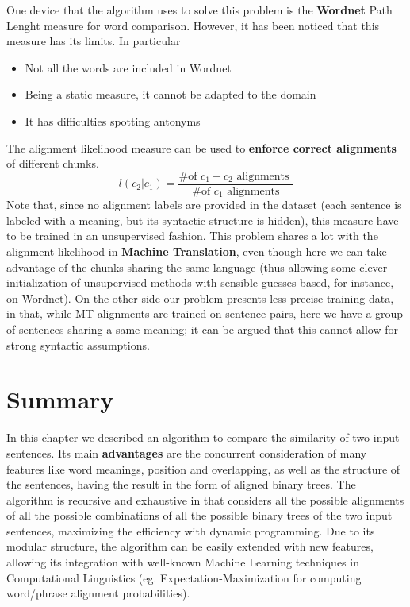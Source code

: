 One device that the algorithm uses to solve this problem is the \textbf{Wordnet} Path Lenght measure for word comparison. However, it has been noticed that this measure has its limits. In particular
\begin{itemize}
\item Not all the words are included in Wordnet
\item Being a static measure, it cannot be adapted to the domain
\item It has difficulties spotting antonyms
\end{itemize}
The alignment likelihood measure can be used to \textbf{enforce correct alignments} of different chunks.
$$
l(c_2|c_1)=\frac{\text{\# of }c_1-c_2\text{ alignments }}{\text{\# of }c_1\text{ alignments}}
$$
Note that, since no alignment labels are provided in the dataset (each sentence is labeled with a meaning, but its syntactic structure is hidden), this measure have to be trained in an unsupervised fashion. This problem shares a lot with the alignment likelihood in \textbf{Machine Translation}, even though here we can take advantage of the chunks sharing the same language (thus allowing some clever initialization of unsupervised methods with sensible guesses based, for instance, on Wordnet). On the other side our problem presents less precise training data, in that, while MT alignments are trained on sentence pairs, here we have a group of sentences sharing a same meaning; it can be argued that this cannot allow for strong syntactic assumptions.

\section{Summary} \label{conclusions}
In this chapter we described an algorithm to compare the similarity of two input sentences. Its main \textbf{advantages} are the concurrent consideration of many features like word meanings, position and overlapping, as well as the structure of the sentences, having the result in the form of aligned binary trees. The algorithm is recursive and exhaustive in that considers all the possible alignments of all the possible combinations of all the possible binary trees of the two input sentences, maximizing the efficiency with dynamic programming. Due to its modular structure, the algorithm can be easily extended with new features, allowing its integration with well-known Machine Learning techniques in Computational Linguistics (eg. Expectation-Maximization for computing word/phrase alignment probabilities).


